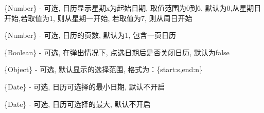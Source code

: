 \documentclass[letterpaper,10pt,english]{sphinxmanual}
\begin{document}
\begin{fulllineitems}
\label{api/component/calendar/index:Calendar.startDay}
\{Number\} - 可选, 日历显示星期x为起始日期, 取值范围为0到6, 默认为0,从星期日开始,若取值为1, 则从星期一开始, 若取值为7, 则从周日开始

\end{fulllineitems}



\begin{fulllineitems}
\label{api/component/calendar/index:Calendar.pages}
\{Number\} - 可选, 日历的页数, 默认为1, 包含一页日历

\end{fulllineitems}



\begin{fulllineitems}
\label{api/component/calendar/index:Calendar.closable}
\{Boolean\} - 可选, 在弹出情况下, 点选日期后是否关闭日历, 默认为false

\end{fulllineitems}



\begin{fulllineitems}
\label{api/component/calendar/index:Calendar.rangeSelect}
\{Object\} - 可选, 默认显示的选择范围, 格式为：\{start:s,end:n\}

\end{fulllineitems}



\begin{fulllineitems}
\label{api/component/calendar/index:Calendar.minDate}
\{Date\} - 可选, 日历可选择的最小日期, 默认不开启

\end{fulllineitems}



\begin{fulllineitems}
\label{api/component/calendar/index:Calendar.maxDate}
\{Date\} - 可选, 日历可选择的最大, 默认不开启

\end{fulllineitems}
\end{document}
